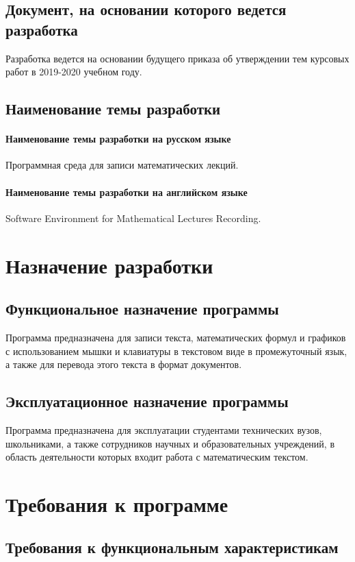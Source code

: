 \documentclass[techtask]{espd}
\begin{document}
\subsection{Документ, на основании которого ведется разработка}
Разработка ведется на основании будущего приказа об утверждении тем курсовых работ в 2019-2020 учебном году.

\subsection{Наименование темы разработки}
\paragraph{Наименование темы разработки на русском языке}
Программная среда для записи математических лекций.

\paragraph{Наименование темы разработки на английском языке}
Software Environment for Mathematical Lectures Recording.

\section{Назначение разработки}
\subsection{Функциональное назначение программы}
Программа предназначена для записи текста, математических формул и графиков с использованием мышки и клавиатуры в текстовом виде в промежуточный язык, а также для перевода этого текста в формат документов.

\subsection{Эксплуатационное назначение программы}
Программа предназначена для эксплуатации студентами технических вузов, школьниками, а также сотрудников научных и образовательных учреждений, в область деятельности которых входит работа с математическим текстом.

\section{Требования к программе}
\subsection{Требования к функциональным характеристикам}
\end{document}
